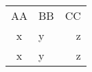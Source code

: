 \documentclass{article}
\newcommand\beinvisible[1]{\leavevmode\unskip\strut\ignorespaces}
\begin{document}
\begin{tabular}{clr}
 AA & BB & CC \\
 x  &  y & z  \\
 \beinvisible{} x & \beinvisible{} y & \beinvisible{} z \\
\end{tabular}
\end{document}
